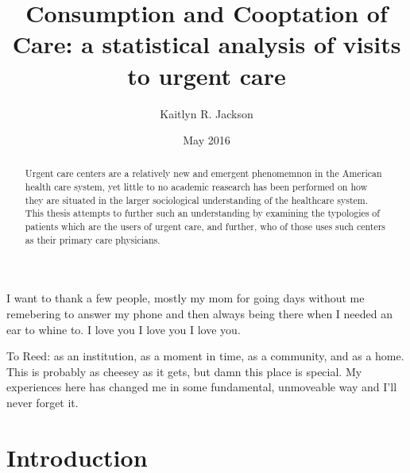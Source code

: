 \documentclass[12pt,twoside]{reedthesis}
\title{Consumption and Cooptation of Care: a statistical analysis of visits to
urgent care}
\author{Kaitlyn R. Jackson}
\date{May 2016}
\begin{document}
      \maketitle
  
  \frontmatter %
  \pagestyle{empty} %

      \begin{acknowledgements}
      I want to thank a few people, mostly my mom for going days without me
      remebering to answer my phone and then always being there when I needed
      an ear to whine to. I love you I love you I love you.
    \end{acknowledgements}
  
  

      \hypersetup{linkcolor=black}
    \setcounter{tocdepth}{2}
    \tableofcontents
  
  
  
      \begin{abstract}
      Urgent care centers are a relatively new and emergent phenomemnon in the
      American health care system, yet little to no academic reasearch has
      been performed on how they are situated in the larger sociological
      understanding of the healthcare system. This thesis attempts to further
      such an understanding by examining the typologies of patients which are
      the users of urgent care, and further, who of those uses such centers as
      their primary care physicians.
    \end{abstract}
  
      \begin{dedication}
      To Reed: as an institution, as a moment in time, as a community, and as
      a home. This is probably as cheesey as it gets, but damn this place is
      special. My experiences here has changed me in some fundamental,
      unmoveable way and I'll never forget it.
    \end{dedication}
  
  \mainmatter %
  \pagestyle{fancyplain} %

  \chapter*{Introduction}\label{introduction}
  
  \onehalfspacing
  
\end{document}
